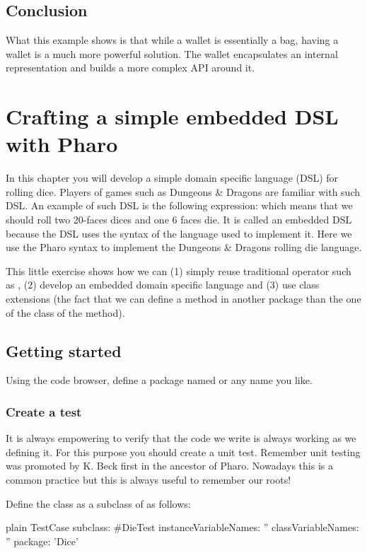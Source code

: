 \documentclass[10pt,twoside,english]{_support/latex/sbabook/sbabook}
\begin{document}
\section{Conclusion}
What this example shows is that while a wallet is essentially a bag, having a wallet is a much more powerful solution.
The wallet encapsulates an internal representation and builds a more complex API around it. 

\chapter{Crafting a simple embedded DSL with Pharo}\label{cha:dsl}
In this chapter you will develop a simple domain specific language (DSL) for rolling dice. Players of games such as Dungeons \& Dragons are familiar with such DSL. An example of such DSL is the following expression:  which means that we should roll two 20-faces dices and one 6 faces die. 
It is called an embedded DSL because the DSL uses the syntax of the language used to implement it. Here we use the Pharo syntax to implement the Dungeons \& Dragons rolling die language. 

This little exercise shows how we can (1) simply reuse traditional operator such as \textcode{+}, (2) develop an embedded domain specific language and (3) use class extensions (the fact that we can define a method in another package than the one of the class of the method).
\section{Getting started}
Using the code browser, define a package named  or any name you like.
\subsection{Create a test }
It is always empowering to verify that the code we write is always working as we defining it. For this purpose you should create a unit test. Remember unit testing was promoted by K. Beck first in the ancestor of Pharo. Nowadays this is a common practice but this is always useful to remember our roots!

Define the class  as a subclass of  as follows: 

\begin{displaycode}{plain}
TestCase subclass: #DieTest
	instanceVariableNames: ''
	classVariableNames: ''
	package: 'Dice'
\end{displaycode}
\end{document}
